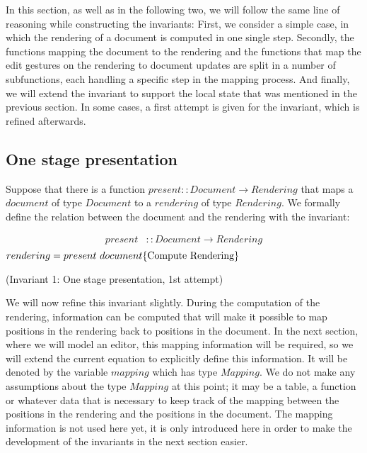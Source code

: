 \documentclass[twoside,epsf]{report}
\begin{document}
In this section, as well as in the following two, we will follow the same line of reasoning while constructing the invariants: First, we consider a simple case, in which the rendering of a document is computed in one single step. Secondly, the functions mapping the document to the rendering and the functions that map the edit gestures on the rendering to document updates are split in a number of subfunctions, each handling a specific step in the mapping process. And finally, we will extend the invariant to support the local state that was mentioned in the previous section. In some cases, a first attempt is given for the invariant, which is refined afterwards. 


\subsection{One stage presentation}


Suppose that there is a function $present :: Document \rightarrow Rendering$ that maps a $document$ of type $Document$ to a $rendering$ of type $Rendering$. We formally define the relation between the document and the rendering with the invariant:\begin{small}\begin{align*} %
present & :: Document \rightarrow Rendering \\
\end{align*}
\begin{math}
rendering = present~document
\hfill \text{\{Compute Rendering\}}
\end{math}\end{small}

{\centering (Invariant 1: One stage presentation, 1st attempt)\\}\vspace{1em}

We will now refine this invariant slightly. During the computation of the rendering, information can be computed that will make it possible to map positions in the rendering back to positions in the document. In the next section, where we will model an editor, this mapping information will be required, so we will extend the current equation to explicitly define this information. It will be denoted by the variable $mapping$ which has type $Mapping$. We do not make any assumptions about the type $Mapping$ at this point; it may be a table, a function or whatever data that is necessary to keep track of the mapping between the positions in the rendering and the positions in the document. The mapping information is not used here yet, it is only introduced here in order to make the development of the invariants in the next section easier. 
\end{document}
